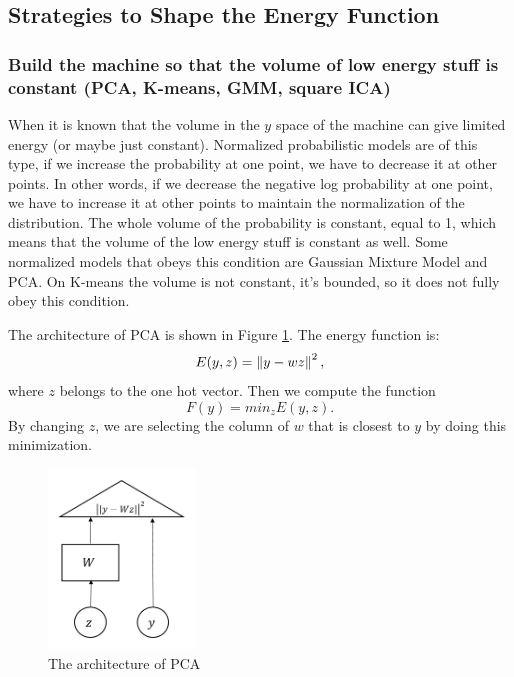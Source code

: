 \subsection{Strategies to Shape the Energy Function}

\subsubsection{Build the machine so that the volume of low energy stuff is constant (PCA, K-means, GMM, square ICA)}

When it is known that the volume in the $y$ space of the machine can give limited energy (or maybe just constant). 
Normalized probabilistic models are of this type, if we increase the probability at one point, we have to decrease it at other points.
In other words, if we decrease the negative log probability at one point, we have to increase it at other points to maintain the normalization of the distribution. 
The whole volume of the probability is constant, equal to 1, which means that the volume of the low energy stuff is constant as well. Some normalized models that obeys this condition are Gaussian Mixture Model and PCA. On K-means the volume is not constant, it's bounded, so it does not fully obey this condition. 

The architecture of PCA is shown in Figure \ref{figure2}. The energy function is:
\begin{equation}
E(y,z) =  \norm{y-wz}^2,
\end{equation}
where $z$ belongs to the one hot vector. Then we compute the function 
\begin{equation}
F(y) =  min_z E(y,z).
\end{equation}
By changing $z$, we are selecting the column of $w$ that is closest to $y$ by doing this minimization.

\begin{figure}[H]
    \centering
    \includegraphics[width=0.35\textwidth]{figs/pic7.png}
    \caption{The architecture of PCA}
    \label{figure2}
\end{figure}

